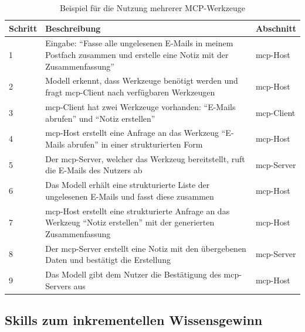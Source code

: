 \begin{table}[!htb]
    \centering
    \caption{Beispiel für die Nutzung mehrerer MCP-Werkzeuge}
    \label{tab:modelcontextprotocol_example}
    \begin{tabular}{C{1.25cm} L{9cm} C{2.75cm}}
        \hline
        \textbf{Schritt} & \textbf{Beschreibung} & \textbf{Abschnitt} \\
        \hline

        1 & Eingabe: \enquote{Fasse alle ungelesenen E-Mails in meinem Postfach zusammen und erstelle eine Notiz mit der Zusammenfassung} & \gls{mcp}-Host \\

        2 & Modell erkennt, dass Werkzeuge benötigt werden und fragt \gls{mcp}-Client nach verfügbaren Werkzeugen & \gls{mcp}-Host \\

        3 & \gls{mcp}-Client hat zwei Werkzeuge vorhanden: \enquote{E-Mails abrufen} und \enquote{Notiz erstellen} & \gls{mcp}-Client \\

        4 & \gls{mcp}-Host erstellt eine Anfrage an das Werkzeug \enquote{E-Mails abrufen} in einer strukturierten Form & \gls{mcp}-Host \\

        5 & Der \gls{mcp}-Server, welcher das Werkzeug bereitstellt, ruft die E-Mails des Nutzers ab & \gls{mcp}-Server \\

        6 & Das Modell erhält eine strukturierte Liste der ungelesenen E-Mails und fasst diese zusammen & \gls{mcp}-Host \\

        7 & \gls{mcp}-Host erstellt eine strukturierte Anfrage an das Werkzeug \enquote{Notiz erstellen} mit der generierten Zusammenfassung & \gls{mcp}-Host \\

        8 & Der \gls{mcp}-Server erstellt eine Notiz mit den übergebenen Daten und bestätigt die Erstellung & \gls{mcp}-Server \\

        9 & Das Modell gibt dem Nutzer die Bestätigung des \gls{mcp}-Servers aus & \gls{mcp}-Host \\

        \hline
    \end{tabular}
\end{table}

\subsection{Skills zum inkrementellen Wissensgewinn}
\label{sec:skills}

